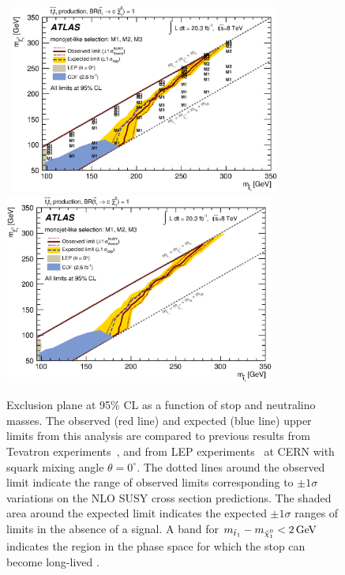 \begin{figure}[!ht]
\begin{center}
\mbox{
\includegraphics[width=0.795\textwidth]{Interpretations/Figures/limitPlotStop_Stop_combined_M1_M2_M3_BestRegion.eps}
}
\mbox{
\includegraphics[width=0.795\textwidth]{Interpretations/Figures/limitPlotStop_Stop_combined_M1_M2_M3_.eps}
}
\end{center}
\caption[Exclusion plane at 95\% CL for stop pair production with $\stoptocharm$ as a function of the $m_{\stop}$ and $m_{\ninoone}$, combining the selections M1 to M3.]{Exclusion plane at 95\% CL as a function of stop and neutralino masses. The observed (red line) and expected (blue line) upper limits from this analysis are compared to previous results from Tevatron experiments~\cite{Abazov:2008rc}, and from LEP experiments~\cite{Aaltonen:2012tq} at CERN with squark mixing angle $\theta=0^{\circ}$. The dotted lines around the observed limit indicate the range of observed limits corresponding to $\pm 1 \sigma$ variations on the NLO SUSY cross section predictions. The shaded area around the expected limit indicates the expected $\pm 1 \sigma$ ranges of limits in the absence of a signal. A band for $m_{\stopone} - m_{\ninoone}< \unit[2]{GeV}$ indicates the region in the phase space for which the stop can become long-lived \protect\cite{Aad:2014nra}.}
\label{fig:ExclusionStoptocharm}
\end{figure}

